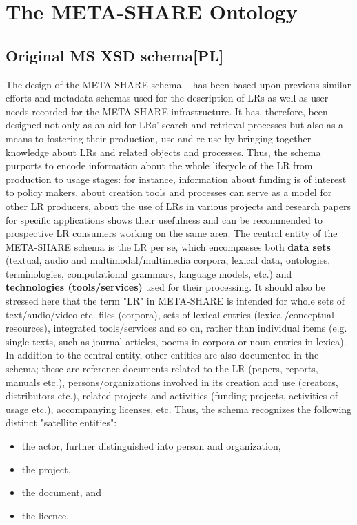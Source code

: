 \documentclass{llncs}
\begin{document}
\section{The META-SHARE Ontology}
\label{sec:ontology}
\subsection{Original MS XSD schema[PL]}
\label{sec:xsd}
The design of the META-SHARE schema ~\cite{gavrilidou2012metashare} has been based upon previous similar efforts and metadata schemas used for the description of LRs as well as user needs recorded for the META-SHARE infrastructure. It has, therefore, been designed not only as an aid for LRs' search and retrieval processes but also as a means to fostering their production, use and re-use by bringing together knowledge about LRs and related objects and processes. Thus, the schema purports to encode information about the whole lifecycle of the LR from production to usage stages: for instance, information about funding is of interest to policy makers, about creation tools and processes can serve as a model for other LR producers, about the use of LRs in various projects and research papers for specific applications shows their usefulness and can be recommended to prospective LR consumers working on the same area.
The central entity of the META-SHARE schema is the LR per se, which encompasses both {\bf data sets} (textual, audio and multimodal/multimedia corpora, lexical data, ontologies, terminologies, computational grammars, language models, etc.) and {\bf technologies (tools/services)} used for their processing. It should also be stressed here that the term "LR" in META-SHARE is intended for whole sets of text/audio/video etc. files (corpora), sets of lexical entries (lexical/conceptual resources), integrated tools/services and so on, rather than individual items (e.g. single texts, such as journal articles, poems in corpora or noun entries in lexica).
In addition to the central entity, other entities are also documented in the schema; these are reference documents related to the LR (papers, reports, manuals etc.), persons/organizations involved in its creation and use (creators, distributors etc.), related projects and activities (funding projects, activities of usage etc.), accompanying licenses, etc. Thus, the schema recognizes the following distinct "satellite entities":
\begin{itemize}
\item the actor, further distinguished into person and organization,
\item the project,
\item the document, and
\item the licence.
\end{itemize}
\end{document}
